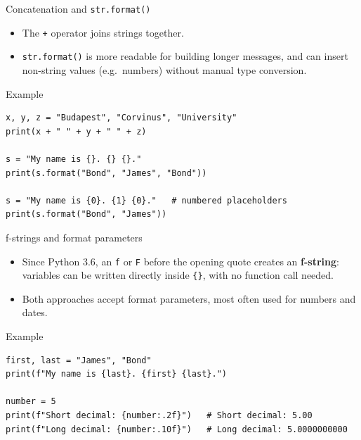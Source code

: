 \documentclass[aspectratio=169,11pt]{beamer}
\begin{document}
\begin{frame}[fragile]{Concatenation and \texttt{str.format()}}
  \begin{itemize}
    \item The \texttt{+} operator joins strings together.
    \item \texttt{str.format()} is more readable for building longer messages,
          and can insert non-string values (e.g.\ numbers) without manual
          type conversion.
  \end{itemize}
  \begin{block}{Example}
\begin{verbatim}
x, y, z = "Budapest", "Corvinus", "University"
print(x + " " + y + " " + z)

s = "My name is {}. {} {}."
print(s.format("Bond", "James", "Bond"))

s = "My name is {0}. {1} {0}."   # numbered placeholders
print(s.format("Bond", "James"))
\end{verbatim}
  \end{block}
\end{frame}

\begin{frame}[fragile]{f-strings and format parameters}
  \begin{itemize}
    \item Since Python 3.6, an \texttt{f} or \texttt{F} before the opening
          quote creates an \textbf{f-string}: variables can be written
          directly inside \texttt{\{\}}, with no function call needed.
    \item Both approaches accept format parameters, most often used for
          numbers and dates.
  \end{itemize}
  \begin{block}{Example}
\begin{verbatim}
first, last = "James", "Bond"
print(f"My name is {last}. {first} {last}.")

number = 5
print(f"Short decimal: {number:.2f}")   # Short decimal: 5.00
print(f"Long decimal: {number:.10f}")   # Long decimal: 5.0000000000
\end{verbatim}
  \end{block}
\end{frame}
\end{document}
